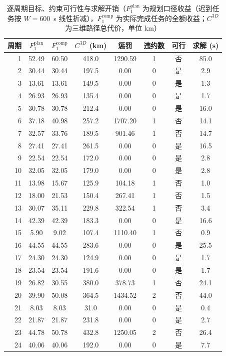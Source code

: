 \documentclass[a4paper,11pt]{article}
\begin{document}
\begin{table}[htbp]\centering
\caption{逐周期目标、约束可行性与求解开销（$F_1^{\mathrm{plan}}$ 为规划口径收益（迟到任务按 $W=600$~s 线性折减），$F_1^{\mathrm{comp}}$ 为实际完成任务的全额收益；$C^{3D}$ 为三维路径总代价，单位 km）}
\label{tab:exp01-objective}
\begin{tabular}{rccccccc}
\toprule
周期 & $F_1^{\mathrm{plan}}$ & $F_1^{\mathrm{comp}}$ & $C^{3D}$ (km) & 惩罚 & 违约数 & 可行 & 求解 (s) \\
\midrule
1 & 52.49 & 60.50 & 418.0 & 1290.59 & 1 & 否 & 85.0 \\
2 & 30.44 & 30.44 & 197.5 & 0.00 & 0 & 是 & 2.9 \\
3 & 13.61 & 13.61 & 149.5 & 0.00 & 0 & 是 & 1.3 \\
4 & 26.93 & 26.93 & 135.4 & 0.00 & 0 & 是 & 1.7 \\
5 & 30.78 & 30.78 & 212.4 & 0.00 & 0 & 是 & 16.0 \\
6 & 37.18 & 40.98 & 257.2 & 1707.20 & 1 & 否 & 14.1 \\
7 & 32.57 & 33.76 & 189.5 & 901.46 & 1 & 否 & 14.7 \\
8 & 27.41 & 27.41 & 261.5 & 0.00 & 0 & 是 & 16.5 \\
9 & 22.54 & 22.54 & 172.0 & 0.00 & 0 & 是 & 2.8 \\
10 & 32.05 & 32.05 & 179.0 & 0.00 & 0 & 是 & 2.8 \\
11 & 13.98 & 15.67 & 125.9 & 104.18 & 1 & 否 & 1.0 \\
12 & 18.00 & 21.53 & 150.4 & 267.41 & 1 & 否 & 1.5 \\
13 & 30.07 & 35.11 & 229.8 & 322.54 & 1 & 否 & 3.4 \\
14 & 42.39 & 42.39 & 183.3 & 0.00 & 0 & 是 & 16.6 \\
15 & 5.90 & 9.02 & 107.4 & 1110.40 & 1 & 否 & 0.9 \\
16 & 44.55 & 44.55 & 283.6 & 0.00 & 0 & 是 & 25.5 \\
17 & 24.30 & 24.30 & 124.9 & 0.00 & 0 & 是 & 1.7 \\
18 & 23.54 & 23.54 & 191.6 & 0.00 & 0 & 是 & 1.7 \\
19 & 26.82 & 30.55 & 380.0 & 378.73 & 1 & 否 & 24.1 \\
20 & 39.90 & 50.08 & 364.5 & 1434.52 & 2 & 否 & 44.0 \\
21 & 8.03 & 8.03 & 31.0 & 0.00 & 0 & 是 & 0.4 \\
22 & 21.87 & 21.87 & 231.8 & 0.00 & 0 & 是 & 2.7 \\
23 & 44.78 & 50.78 & 432.8 & 1250.05 & 2 & 否 & 26.4 \\
24 & 40.06 & 40.06 & 192.0 & 0.00 & 0 & 是 & 7.7 \\
\bottomrule
\end{tabular}
\end{table}
\end{document}
